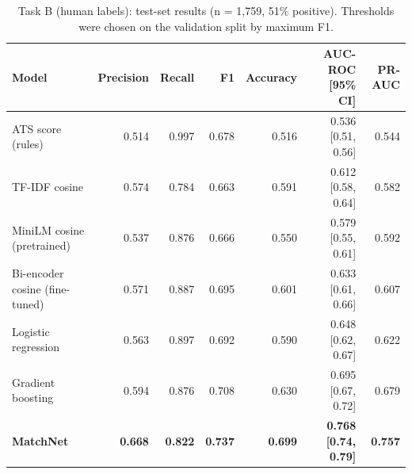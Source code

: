 \begin{table}[H]
\centering\small
\begin{tabularx}{\linewidth}{@{}l r r r r r r@{}}
\toprule
Model & Precision & Recall & F1 & Accuracy & AUC-ROC [95\% CI] & PR-AUC\\
\midrule
ATS score (rules) & 0.514 & 0.997 & 0.678 & 0.516 & 0.536 [0.51, 0.56] & 0.544\\
TF-IDF cosine & 0.574 & 0.784 & 0.663 & 0.591 & 0.612 [0.58, 0.64] & 0.582\\
MiniLM cosine (pretrained) & 0.537 & 0.876 & 0.666 & 0.550 & 0.579 [0.55, 0.61] & 0.592\\
Bi-encoder cosine (fine-tuned) & 0.571 & 0.887 & 0.695 & 0.601 & 0.633 [0.61, 0.66] & 0.607\\
Logistic regression & 0.563 & 0.897 & 0.692 & 0.590 & 0.648 [0.62, 0.67] & 0.622\\
Gradient boosting & 0.594 & 0.876 & 0.708 & 0.630 & 0.695 [0.67, 0.72] & 0.679\\
\textbf{MatchNet} & \textbf{0.668} & \textbf{0.822} & \textbf{0.737} & \textbf{0.699} & \textbf{0.768 [0.74, 0.79]} & \textbf{0.757}\\
\bottomrule
\end{tabularx}
\caption{Task B (human labels): test-set results (n = 1,759, 51\% positive). Thresholds were chosen on the validation split by maximum F1.}\label{tab:reshuman}
\end{table}

